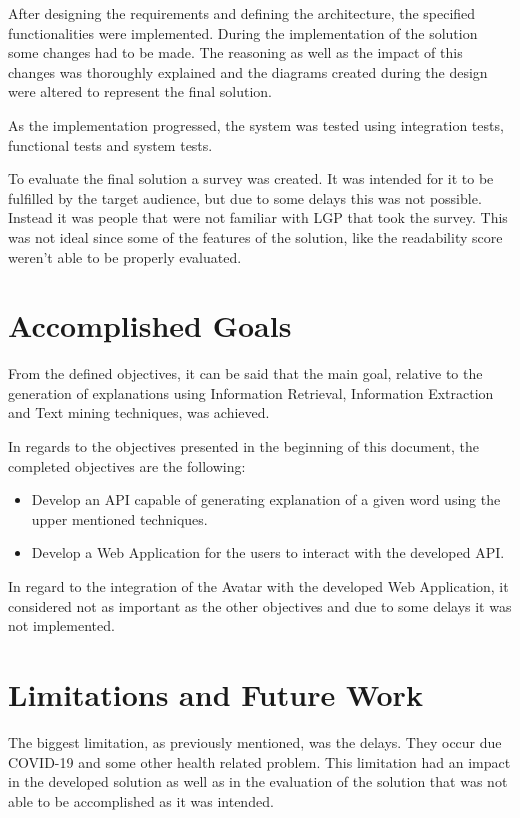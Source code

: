 After designing the requirements and defining the architecture, the specified functionalities were implemented.
During the implementation of the solution some changes had to be made.
The reasoning as well as the impact of this changes was thoroughly explained and the diagrams created during the design were altered to represent the final solution.

As the implementation progressed, the system was tested using integration tests, functional tests and system tests.

To evaluate the final solution a survey was created.
It was intended for it to be fulfilled by the target audience, but due to some delays this was not possible.
Instead it was people that were not familiar with \gls{LGP} that took the survey.
This was not ideal since some of the features of the solution, like the readability score weren't able to be properly evaluated.

\section{Accomplished Goals}

From the defined objectives, it can be said that the main goal, relative to the generation of explanations using Information Retrieval, Information Extraction and Text mining techniques, was achieved.

In regards to the objectives presented in the beginning of this document, the completed objectives are the following:
\begin{itemize}
        \item Develop an API capable of generating explanation of a given word using the upper mentioned techniques.
        \item Develop a Web Application for the users to interact with the developed API.
\end{itemize}

In regard to the integration of the Avatar with the developed Web Application, it considered not as important as the other objectives and due to some delays it was not implemented.

\section{Limitations and Future Work}

The biggest limitation, as previously mentioned, was the delays.
They occur due COVID-19 and some other health related problem.
This limitation had an impact in the developed solution as well as in the evaluation of the solution that was not able to be accomplished as it was intended.

